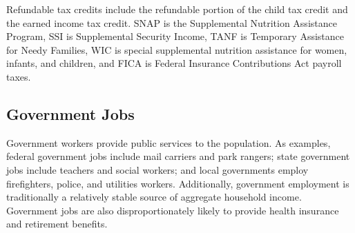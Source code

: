 \begin{minipage}{0.76\textwidth}
\footnotesize{Refundable tax credits include the refundable portion of the child tax credit and the earned income tax credit. SNAP is the Supplemental Nutrition Assistance Program, SSI is Supplemental Security Income, TANF is Temporary Assistance for Needy Families, WIC is special supplemental nutrition assistance for women, infants, and children, and FICA is Federal Insurance Contributions Act payroll taxes. }\\
\end{minipage}
\newpage
\hypertarget{govjo}{\label{govjo}}
\vspace*{-16mm}

\subsection*{Government Jobs}
\begin{minipage}{0.76\textwidth}
 
\small Government workers provide public services to the population. As examples, federal government jobs include mail carriers and park rangers; state government jobs include teachers and social workers; and local governments employ firefighters, police, and utilities workers. Additionally, government employment is traditionally a relatively stable source of aggregate household income. Government jobs are also disproportionately likely to provide health insurance and retirement benefits.  
\end{minipage}
\vspace{1mm}

\begin{minipage}{0.36\textwidth}
\\
\end{minipage}\hspace{5mm}
\begin{minipage}{0.36\textwidth}
\small 
\end{minipage}
\vspace{3mm}

